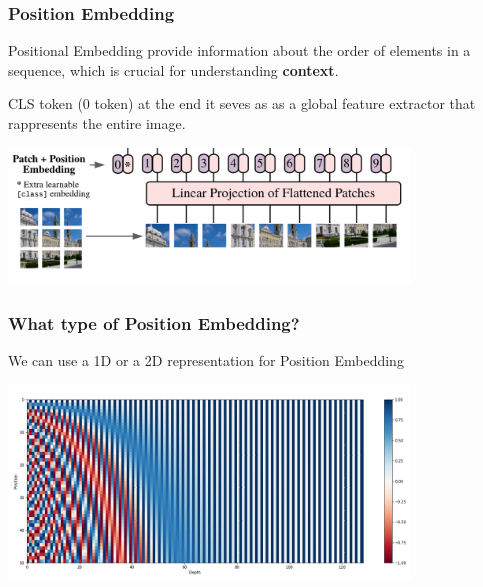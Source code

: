 \begin{frame}
\frametitle{Position Embedding}

Positional Embedding provide information about the order of elements in a sequence, which is crucial for understanding \textbf{context}.

\vspace{0.5cm}

CLS token (0 token) at the end it seves as as a global feature extractor that rappresents the entire image.

\begin{center}
    \includegraphics[width=0.8\textwidth]{img/2-section/Posizion enbedding.png} 
\end{center}
\end{frame}

\begin{frame}
\frametitle{What type of Position Embedding?}

We can use a 1D or a 2D representation for Position Embedding

\begin{center}
    \includegraphics[width=0.8\textwidth]{img/2-section/positional_encoding.png} 
\end{center}
\end{frame}

